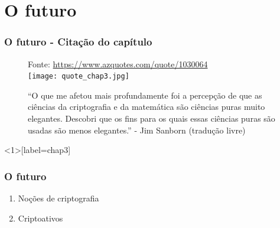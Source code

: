 \documentclass[aspectratio=43,8pt]{beamer}%
\begin{document}
\section{O futuro}

\begin{frame}
	\frametitle{O futuro - Citação do capítulo}
	
		\begin{figure}
		\centering
		{\footnotesize Fonte:  \url{https://www.azquotes.com/quote/1030064}}\\
		\texttt{[image: quote\_chap3.jpg]}
		\caption{``O que me afetou mais profundamente foi a
			percepção de que as ciências da criptografia e
			da matemática são ciências puras muito
			elegantes. Descobri que os fins para os quais
			essas ciências puras são usadas são menos
			elegantes.'' -  Jim Sanborn
			(tradução livre)}
	\end{figure}
\end{frame}

\begin{frame}<1>[label=chap3]
	\frametitle{O futuro}
	\begin{keypoint}
		
		\begin{enumerate}
			\item Noções de criptografia 
\pause			
			\item Criptoativos 
			
		\end{enumerate} 
	\end{keypoint}
\end{frame}
\end{document}
